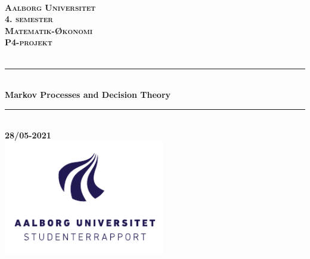 %
\begin{titlepage}

\thispagestyle{empty}

\newcommand{\HRule}{\rule{\linewidth}{0.5mm}}

\center

\textsc{}\\[2.5cm]
    
\textsc{\textbf{\LARGE Aalborg Universitet}}\\[1.5cm]

\textsc{\textbf{\Large 4. semester}}\\[0.5cm]

\textsc{\textbf{\large Matematik-Økonomi}}\\[0.5cm]

\textsc{\textbf{\large P4-projekt}}\\[0.5cm]

\textsc{\textbf{\large }}\\[0.5cm]

\HRule \\[0.4cm]

{\huge \bfseries Markov Processes and Decision Theory }\\[0.4cm]

\HRule\\[1.5cm]

\textbf{\large 28/05-2021}\\[1cm]

\includegraphics[height=5cm]{Formalia/AAU-logo-stud-DK-RGB.pdf}

\vfill

\end{titlepage}
\pagebreak
\thispagestyle{empty}
\phantom{a}
\clearpage